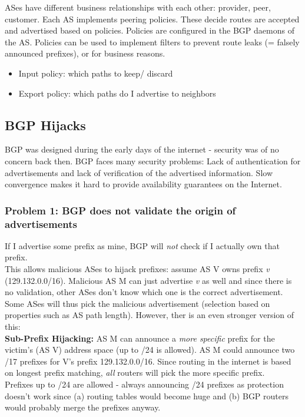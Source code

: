 \documentclass[11pt,oneside,a4paper]{article}
\begin{document}
\newpage

ASes have different business relationships with each other: provider, peer, customer. Each AS implements peering policies. These decide routes are accepted and advertised based on policies. Policies are configured in the BGP daemons of the AS. Policies can be used to implement filters to prevent route leaks (= falsely announced prefixes), or for business reasons.

\vspace{-\topsep}
\begin{itemize}
	\setlength{\itemsep}{0pt}
	\setlength{\parskip}{0pt}
	\item Input policy: which paths to keep/ discard
	\item Export policy: which paths do I advertise to neighbors
\end{itemize}
\vspace{-\topsep}

\subsection{BGP Hijacks}

BGP was designed during the early days of the internet - security was of no concern back then. BGP faces many security problems: Lack of authentication for advertisements and lack of verification of the advertised information. Slow convergence makes it hard to provide availability guarantees on the Internet.

\subsubsection{Problem 1: BGP does not validate the origin of advertisements}
\label{bgp_problem_1}

If I advertise some prefix as mine, BGP will \textit{not} check if I actually own that prefix.\\
This allows malicious ASes to hijack prefixes: assume AS V owns prefix \textit{v} (129.132.0.0/16). Malicious AS M can just advertise \textit{v} as well and since there is no validation, other ASes don't know which one is the correct advertisement.  Some ASes will thus pick the malicious advertisement (selection based on properties such as AS path length). However, ther is an even stronger version of this:\\

\textbf{Sub-Prefix Hijacking:} AS M can announce a \textit{more specific} prefix for the victim's (AS V) address space (up to /24 is allowed). AS M could announce two /17 prefixes for V's prefix 129.132.0.0/16. Since routing in the internet is based on longest prefix matching, \textit{all} routers will pick the more specific prefix.\\
Prefixes up to /24 are allowed - always announcing /24 prefixes as protection doesn't work since (a) routing tables would become huge and (b) BGP routers would probably merge the prefixes anyway.
\end{document}

